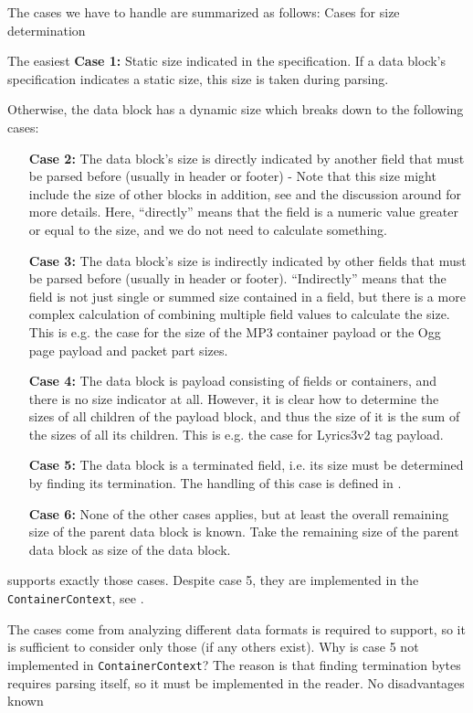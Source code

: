 The cases we have to handle are summarized as follows:
{%
Cases for size determination
}
{%
  The easiest \textbf{Case 1:} Static size indicated in the specification. If a data block's specification indicates a static size, this size is taken during parsing.

  Otherwise, the data block has a dynamic size which breaks down to the following cases:
  \begin{enumerate}
  \item[\textbf{Case 2:}] The data block's size is directly indicated by another field that must be parsed before (usually in header or footer) - Note that this size might include the size of other blocks in addition, see  and the discussion around for more details. Here, ``directly'' means that the field is a numeric value greater or equal to the size, and we do not need to calculate something.
  \item[\textbf{Case 3:}] The data block's size is indirectly indicated by other fields that must be parsed before (usually in header or footer). ``Indirectly'' means that the field is not just single or summed size contained in a field, but there is a more complex calculation of combining multiple field values to calculate the size. This is e.g. the case for the size of the MP3 container payload or the Ogg page payload and packet part sizes.
  \item[\textbf{Case 4:}] The data block is payload consisting of fields or containers, and there is no size indicator at all. However, it is clear how to determine the sizes of all children of the payload block, and thus the size of it is the sum of the sizes of all its children. This is e.g. the case for Lyrics3v2 tag payload.  
  \item[\textbf{Case 5:}] The data block is a terminated field, i.e. its size must be determined by finding its termination. The handling of this case is defined in .
  \item[\textbf{Case 6:}] None of the other cases applies, but at least the overall remaining size of the parent data block is known. Take the remaining size of the parent data block as size of the data block.
  \end{enumerate}

  \LibName{} supports exactly those cases. Despite case 5, they are implemented in the \texttt{ContainerContext}, see .
}
{%
The cases come from analyzing different data formats \LibName{} is required to support, so it is sufficient to consider only those (if any others exist). Why is case 5 not implemented in \texttt{ContainerContext}? The reason is that finding termination bytes requires parsing itself, so it must be implemented in the reader.
}
{%
No disadvantages known
}

